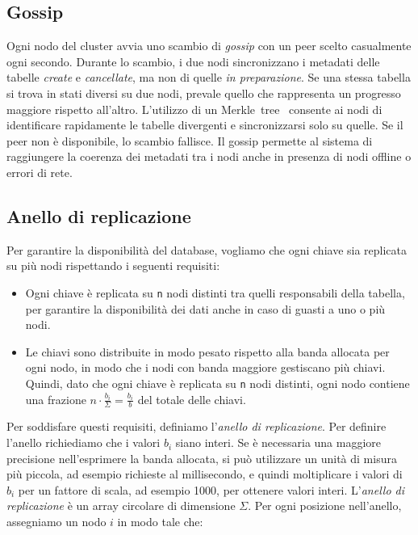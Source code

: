 \subsection{Gossip}
\label{subsec:gossip}

Ogni nodo del cluster avvia uno scambio di \emph{gossip} con un peer scelto casualmente ogni secondo.
Durante lo scambio, i due nodi sincronizzano i metadati delle tabelle \emph{create} e \emph{cancellate}, ma non di quelle \emph{in preparazione}.
Se una stessa tabella si trova in stati diversi su due nodi, prevale quello che rappresenta un progresso maggiore rispetto all'altro.
L'utilizzo di un Merkle~tree~\cite{MerkleTree} consente ai nodi di identificare rapidamente le tabelle divergenti e sincronizzarsi solo su quelle.
Se il peer non è disponibile, lo scambio fallisce.
Il gossip permette al sistema di raggiungere la coerenza dei metadati tra i nodi anche in presenza di nodi offline o errori di rete.

\subsection{Anello di replicazione}
\label{subsec:anello-replicazione}

Per garantire la disponibilità del database, vogliamo che ogni chiave sia replicata su più nodi rispettando i seguenti requisiti:

\begin{itemize}
    \item Ogni chiave è replicata su \texttt{n} nodi distinti tra quelli responsabili della tabella, per garantire la disponibilità dei dati anche in caso di guasti a uno o più nodi.
    \item Le chiavi sono distribuite in modo pesato rispetto alla banda allocata per ogni nodo, in modo che i nodi con banda maggiore gestiscano più chiavi. Quindi, dato che ogni chiave è replicata su \texttt{n} nodi distinti, ogni nodo contiene una frazione $\displaystyle n \cdot \frac{b_i}{\Sigma} = \frac{b_i}{b}$ del totale delle chiavi.
\end{itemize}

Per soddisfare questi requisiti, definiamo l'\emph{anello di replicazione}.
Per definire l'anello richiediamo che i valori $b_i$ siano interi. Se è necessaria una maggiore precisione nell'esprimere la banda allocata, si può utilizzare un unità di misura più piccola, ad esempio richieste al millisecondo, e quindi moltiplicare i valori di $b_i$ per un fattore di scala, ad esempio 1000, per ottenere valori interi.
L'\emph{anello di replicazione} è un array circolare di dimensione $\Sigma$.
Per ogni posizione nell'anello, assegniamo un nodo $i$ in modo tale che:


